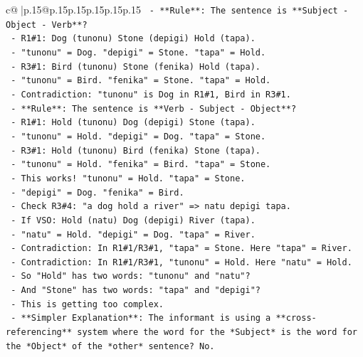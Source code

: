\documentclass{article}
\begin{document}
{\begin{supertabular}{c@{$\;$}|p{.15\linewidth}@{}p{.15\linewidth}p{.15\linewidth}p{.15\linewidth}p{.15\linewidth}p{.15\linewidth}}
{{{\texttt{          {-} **Rule**: The sentence is **Subject {-} Object {-} Verb**?} \\
\texttt{            {-} R1\#1: Dog (tunonu) Stone (depigi) Hold (tapa).} \\
\texttt{              {-} "tunonu" = Dog. "depigi" = Stone. "tapa" = Hold.} \\
\texttt{            {-} R3\#1: Bird (tunonu) Stone (fenika) Hold (tapa).} \\
\texttt{              {-} "tunonu" = Bird. "fenika" = Stone. "tapa" = Hold.} \\
\texttt{              {-} Contradiction: "tunonu" is Dog in R1\#1, Bird in R3\#1.} \\
\texttt{          {-} **Rule**: The sentence is **Verb {-} Subject {-} Object**?} \\
\texttt{            {-} R1\#1: Hold (tunonu) Dog (depigi) Stone (tapa).} \\
\texttt{              {-} "tunonu" = Hold. "depigi" = Dog. "tapa" = Stone.} \\
\texttt{            {-} R3\#1: Hold (tunonu) Bird (fenika) Stone (tapa).} \\
\texttt{              {-} "tunonu" = Hold. "fenika" = Bird. "tapa" = Stone.} \\
\texttt{              {-} This works! "tunonu" = Hold. "tapa" = Stone.} \\
\texttt{              {-} "depigi" = Dog. "fenika" = Bird.} \\
\texttt{            {-} Check R3\#4: "a dog hold a river" => natu depigi tapa.} \\
\texttt{              {-} If VSO: Hold (natu) Dog (depigi) River (tapa).} \\
\texttt{              {-} "natu" = Hold. "depigi" = Dog. "tapa" = River.} \\
\texttt{              {-} Contradiction: In R1\#1/R3\#1, "tapa" = Stone. Here "tapa" = River.} \\
\texttt{              {-} Contradiction: In R1\#1/R3\#1, "tunonu" = Hold. Here "natu" = Hold.} \\
\texttt{              {-} So "Hold" has two words: "tunonu" and "natu"?} \\
\texttt{              {-} And "Stone" has two words: "tapa" and "depigi"?} \\
\texttt{              {-} This is getting too complex.} \\
\texttt{        {-} **Simpler Explanation**: The informant is using a **cross{-}referencing** system where the word for the *Subject* is the word for the *Object* of the *other* sentence? No.} \\
}}}
\end{supertabular}}
\end{document}
